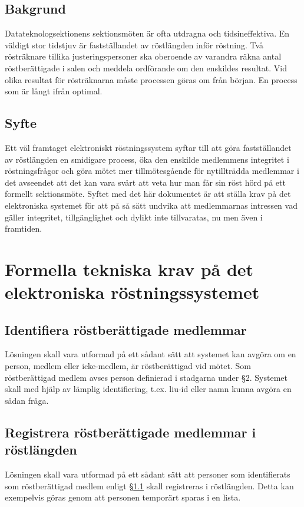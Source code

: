 \documentclass{datateknologsektionen-document}
\begin{document}
\subsection{Bakgrund}
Datateknologsektionens sektionsmöten är ofta utdragna och tidsineffektiva. En väldigt stor tidstjuv
är fastställandet av röstlängden inför röstning. Två rösträknare tillika justeringspersoner ska
oberoende av varandra räkna antal röstberättigade i salen och meddela ordförande om den
enskildes resultat. Vid olika resultat för rösträknarna måste processen göras om från början. En
process som är långt ifrån optimal.
\subsection{Syfte}
Ett väl framtaget elektroniskt röstningssystem syftar till att göra fastställandet av röstlängden en
smidigare process, öka den enskilde medlemmens integritet i röstningsfrågor och göra mötet mer
tillmötesgående för nytillträdda medlemmar i det avseendet att det kan vara svårt att veta hur man
får sin röst hörd på ett formellt sektionsmöte. Syftet med det här dokumentet är att ställa krav på
det elektroniska systemet för att på så sätt undvika att medlemmarnas intressen vad gäller integritet,
tillgänglighet och dylikt inte tillvaratas, nu men även i framtiden.
\section{Formella tekniska krav på det elektroniska röstningssystemet}
\subsection{Identifiera röstberättigade medlemmar}
\label{rostberattigade}
Lösningen skall vara utformad på ett sådant sätt att systemet kan avgöra om en person, medlem eller
icke-medlem, är röstberättigad vid mötet. Som röstberättigad medlem avses person definierad i
stadgarna under \S 2. Systemet skall med hjälp av lämplig identifiering, t.ex. liu-id eller namn kunna
avgöra en sådan fråga.
\subsection{Registrera röstberättigade medlemmar i röstlängden}
\label{registrerarostlangd}
Lösningen skall vara utformad på ett sådant sätt att personer som identifierats som röstberättigad
medlem enligt \S \ref{rostberattigade} skall registreras i röstlängden. Detta kan exempelvis göras genom att personen
temporärt sparas i en lista.
\end{document}
